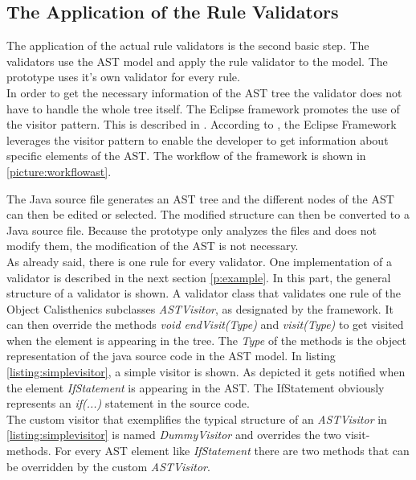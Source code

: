 \subsection{The Application of the Rule Validators}
\label{astvisitorexample}
The application of the actual rule validators is the second basic step. The validators use the \ac{AST} model and apply the rule validator to the model. The prototype uses it's own validator for every rule. 
\\

In order to get the necessary information of the \ac{AST} tree the validator does not have to handle the whole tree itself. The Eclipse framework promotes the use of the visitor pattern. This is described in \cite[p. 366]{gof}. According to \cite{eclipseast}, the Eclipse Framework leverages the visitor pattern to enable the developer to get information about specific elements of the \ac{AST}. The workflow of the framework is shown in \ref{picture:workflowast}. 

The Java source file generates an \ac{AST} tree and the different nodes of the \ac{AST} can then be edited or selected. The modified structure can then be converted to a Java source file. Because the prototype only analyzes the files and does not modify them, the modification of the \ac{AST} is not necessary. 
\\

As already said, there is one rule for every validator. One implementation of a validator is described in the next section \ref{p:example}. In this part, the general structure of a validator is shown. A validator class that validates one rule of the Object Calisthenics subclasses \textit{ASTVisitor}, as designated by the framework. It can then override the methods \textit{void endVisit(Type)} and \textit{visit(Type)} to get visited when the element is appearing in the tree. The \textit{Type} of the methods is the object representation of the java source code in the \ac{AST} model. In listing \ref{listing:simplevisitor}, a simple visitor is shown. As depicted it gets notified when the element \textit{IfStatement} is appearing in the \ac{AST}. The IfStatement obviously represents an \textit{if(...)} statement in the source code. 
\\

The custom visitor that exemplifies the typical structure of an \textit{ASTVisitor} in \ref{listing:simplevisitor} is named \textit{DummyVisitor} and overrides the two visit-methods.
For every \ac{AST} element like \textit{IfStatement} there are two methods that can be overridden by the custom \textit{ASTVisitor}. 
\\

